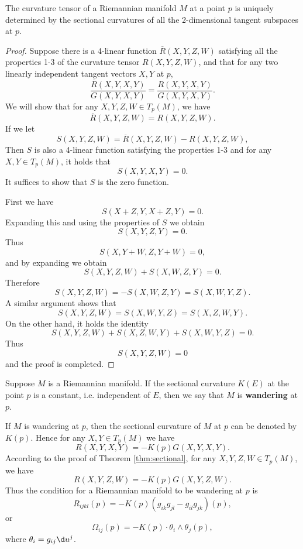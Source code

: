 \documentclass[11pt]{article}
\begin{document}
\begin{theorem}\label{thm:sectional}
    The curvature tensor of a Riemannian manifold $M$ at a point $p$ is uniquely determined by the sectional curvatures of all the 2-dimensional tangent subspaces at $p$. 
\end{theorem}
\begin{proof}
    Suppose there is a 4-linear function $\overline{R}(X, Y, Z, W)$ satisfying all the properties 1-3 of the curvature tensor $R(X, Y, Z, W)$, and that for any two linearly independent tangent vectors $X, Y$ at $p$, $$\frac{\overline{R}(X, Y, X, Y)}{G(X, Y, X, Y)} = \frac{R(X, Y, X, Y)}{G(X, Y, X, Y)}.$$ We will show that for any $X, Y, Z, W \in T_p(M)$, we have $$\overline{R}(X, Y, Z, W) = R(X, Y, Z, W).$$ If we let $$S(X, Y, Z, W) = \overline{R}(X, Y, Z, W) - R(X, Y, Z, W),$$ Then $S$ is also a 4-linear function satisfying the properties 1-3 and for any $X, Y \in T_p(M)$, it holds that $$S(X, Y, X, Y) = 0.$$ It suffices to show that $S$ is the zero function. 

    First we have $$S(X + Z, Y, X + Z, Y) = 0.$$ Expanding this and using the properties of $S$ we obtain $$S(X, Y, Z, Y) = 0.$$ Thus $$S(X, Y + W, Z, Y + W) = 0,$$ and by expanding we obtain $$S(X, Y, Z, W) + S(X, W, Z, Y) = 0.$$ Therefore $$S(X, Y, Z, W) = -S(X, W, Z, Y) = S(X, W, Y, Z).$$ A similar argument shows that $$S(X, Y, Z, W) = S(X, W, Y, Z) = S(X, Z, W, Y).$$ On the other hand, it holds the identity $$S(X, Y, Z, W) + S(X, Z, W, Y) + S(X, W, Y, Z) = 0.$$ Thus $$S(X, Y, Z, W) = 0$$ and the proof is completed. 
\end{proof}

\begin{definition}
    Suppose $M$ is a Riemannian manifold. If the sectional curvature $K(E)$ at the point $p$ is a constant, i.e. independent of $E$, then we say that $M$ is \textbf{wandering} at $p$. 
\end{definition}

If $M$ is wandering at $p$, then the sectional curvature of $M$ at $p$ can be denoted by $K(p)$. Hence for any $X, Y \in T_p(M)$ we have $$R(X, Y, X, Y) = -K(p)G(X, Y, X, Y).$$ According to the proof of Theorem \ref{thm:sectional}, for any $X, Y, Z, W \in T_p(M)$, we have $$R(X, Y, Z, W) = -K(p)G(X, Y, Z, W).$$ Thus the condition for a Riemannian manifold to be wandering at $p$ is $$R_{ijkl}(p) = -K(p)(g_{ik}g_{jl}-g_{il}g_{jk})(p),$$ or $$\Omega_{ij}(p) = -K(p) \cdot \theta_i\wedge\theta_j(p),$$ where $\theta_i = g_{ij}\d u^j$. 
\end{document}
